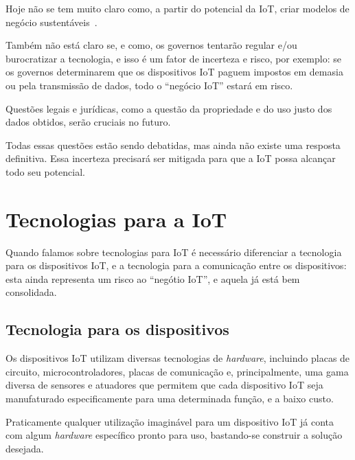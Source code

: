 \documentclass[pdftex, brazil, 12pt, twoside]{article}
\newcommand{\ingles}[1]{\textit{#1}}
\begin{document}
Hoje não se tem muito claro como, a partir do potencial da IoT, criar modelos
de negócio sustentáveis~\citep{IEEEIoTReport,UKGOSWalportIoT2014}.

Também não está claro se, e como, os governos tentarão regular e/ou burocratizar
a tecnologia, e isso é um fator de incerteza e risco, por exemplo: se os governos
determinarem que os dispositivos IoT paguem impostos em demasia ou pela
transmissão de dados, todo o ``negócio IoT'' estará em risco.

Questões legais e jurídicas, como a questão da propriedade e do uso justo
dos dados obtidos, serão cruciais no futuro.

Todas essas questões estão sendo debatidas, mas ainda não existe uma resposta
definitiva. Essa incerteza precisará ser mitigada para que a IoT possa alcançar
todo seu potencial.


\section{Tecnologias para a IoT}
\label{tecnologia-iot}

Quando falamos sobre tecnologias para IoT é necessário diferenciar a tecnologia
para os dispositivos IoT, e a tecnologia para a comunicação entre os dispositivos:
esta ainda representa um risco ao ``negótio IoT'', e aquela já está bem consolidada.


\subsection{Tecnologia para os dispositivos}
\label{tecnologia-iot-dispositivos}

Os dispositivos IoT utilizam diversas tecnologias de \ingles{hardware}, incluindo
placas de circuito, microcontroladores, placas de comunicação e, principalmente,
uma gama diversa de sensores e atuadores que permitem que cada dispositivo IoT
seja manufaturado especificamente para uma determinada função, e a baixo custo.

Praticamente qualquer utilização imaginável para um dispositivo IoT já conta com
algum \ingles{hardware} específico pronto para uso, bastando-se construir a
solução desejada.
\end{document}
